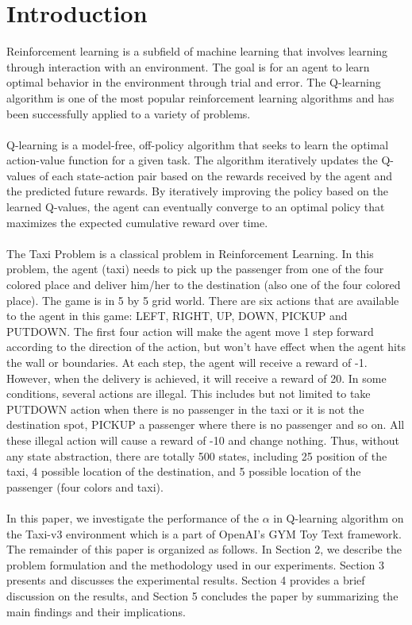 \documentclass[conference]{IEEEtran}
\begin{document}
\section{Introduction}
Reinforcement learning is a subfield of machine learning that involves learning through interaction with an environment. The goal is for an agent to learn optimal behavior in the environment through trial and error. The Q-learning algorithm is one of the most popular reinforcement learning algorithms and has been successfully applied to a variety of problems. \\ \\ Q-learning is a model-free, off-policy algorithm that seeks to learn the optimal action-value function for a given task. The algorithm iteratively updates the Q-values of each state-action pair based on the rewards received by the agent and the predicted future rewards. By iteratively improving the policy based on the learned Q-values, the agent can eventually converge to an optimal policy that maximizes the expected cumulative reward over time. \\ \\ The Taxi Problem is a classical problem in Reinforcement Learning. In this problem, the agent (taxi) needs to pick up the passenger from one of the four colored place and deliver him/her to the destination (also one of the four colored place). The game is in 5 by 5 grid world. There are six actions that are available to the agent in this game: LEFT, RIGHT, UP, DOWN, PICKUP and PUTDOWN. The first four action will make the agent move 1 step forward according to the direction of the action, but won't have effect when the agent hits the wall or boundaries. At each step, the agent will receive a reward of -1. However, when the delivery is achieved, it will receive a reward of 20. In some conditions, several actions are illegal. This includes but not limited to take PUTDOWN action when there is no passenger in the taxi or it is not the destination spot, PICKUP a passenger where there is no passenger and so on. All these illegal action will cause a reward of -10 and change nothing. Thus, without any state abstraction, there are totally 500 states, including 25 position of the taxi, 4 possible location of the destination, and 5 possible location of the passenger (four colors and taxi). \\ \\ In this paper, we investigate the performance of the $\alpha$ in Q-learning algorithm on the Taxi-v3 environment which is a part of OpenAI's GYM Toy Text framework. The remainder of this paper is organized as follows. In Section 2, we describe the problem formulation and the methodology used in our experiments. Section 3 presents and discusses the experimental results. Section 4 provides a brief discussion on the results, and Section 5 concludes the paper by summarizing the main findings and their implications.
\end{document}
